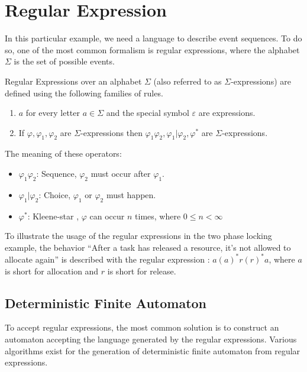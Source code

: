	\section{Regular Expression}
	
		In this particular example, we need a language to describe event sequences. To do so, one of the most common
		formalism is regular expressions, where the alphabet $\Sigma$ is the set of possible events.

		
		\begin{dfn}
			\label{dfn:cep:re}
			Regular Expressions over an alphabet $\Sigma$ (also referred to as $\Sigma$-expressions)
			are defined using the following families of rules.
			\begin{enumerate}
				\item $a$ for every letter $a \in \Sigma$ and the special symbol $\varepsilon$ are expressions.
				\item If $\varphi, \varphi_1, \varphi_2$ are $\Sigma$-expressions then %
					$ %
					\varphi_1 \varphi_2,
					\varphi_1 | \varphi_2,
					\varphi^\ast
					$ are $\Sigma$-expressions\citep{tre}.
			\end{enumerate}
		\end{dfn}

		The meaning of these operators:
		\begin{itemize}
			\item $\varphi_1 \varphi_2$: Sequence, $\varphi_2$ must occur after $\varphi_1$.
			\item $\varphi_1 | \varphi_2$: Choice, $\varphi_1$ or $\varphi_2$ must happen.
			\item $\varphi^\ast$: Kleene-star , $\varphi$ can occur $n$ times, where $0 \leq n < \infty$
		\end{itemize}
		

		To illustrate the usage of the regular expressions in the two phase locking example, the behavior ``After a task has released a resource, it's not allowed to allocate again'' is described with the regular expression : $a (a)^* r (r)^* a $, where $a$ is short for allocation and $r$ is short for release.


		\subsection{Deterministic Finite Automaton}
			To accept regular expressions, the most common solution is to construct an automaton accepting the language generated by the regular expressions. Various  algorithms exist for the generation of deterministic finite automaton from regular expressions.
			
